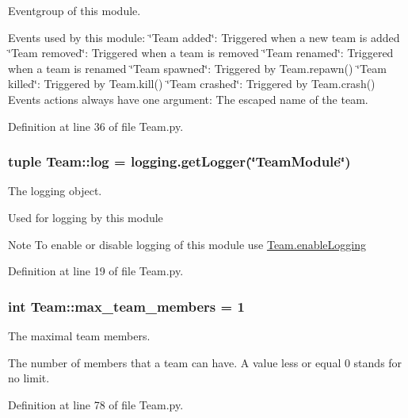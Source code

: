 \-Eventgroup of this module. 

\-Events used by this module\-: \char`\"{}\-Team added\char`\"{}\-: \-Triggered when a new team is added \char`\"{}\-Team removed\char`\"{}\-: \-Triggered when a team is removed \char`\"{}\-Team renamed\char`\"{}\-: \-Triggered when a team is renamed \char`\"{}\-Team spawned\char`\"{}\-: \-Triggered by \-Team.\-repawn() \char`\"{}\-Team killed\char`\"{}\-: \-Triggered by \-Team.\-kill() \char`\"{}\-Team crashed\char`\"{}\-: \-Triggered by \-Team.\-crash() \-Events actions always have one argument\-: \-The escaped name of the team. 

\-Definition at line 36 of file \-Team.\-py.

\hypertarget{namespace_team_adf21711f1fc38203ea2e00d2118b33bc}{
\subsubsection[{log}]{\setlength{\rightskip}{0pt plus 5cm}tuple {\bf \-Team\-::log} = logging.\-get\-Logger(\char`\"{}\-Team\-Module\char`\"{})}}
\label{namespace_team_adf21711f1fc38203ea2e00d2118b33bc}


\-The logging object. 

\-Used for logging by this module \begin{DoxyNote}{\-Note}
\-To enable or disable logging of this module use \hyperlink{namespace_team_abaa01768200015ab5ae4afc3d2d54eec}{\-Team.\-enable\-Logging} 
\end{DoxyNote}


\-Definition at line 19 of file \-Team.\-py.

\hypertarget{namespace_team_a94ac5cfcfc198fffc68d90217c447051}{
\subsubsection[{max\-\_\-team\-\_\-members}]{\setlength{\rightskip}{0pt plus 5cm}int {\bf \-Team\-::max\-\_\-team\-\_\-members} = 1}}
\label{namespace_team_a94ac5cfcfc198fffc68d90217c447051}


\-The maximal team members. 

\-The number of members that a team can have. \-A value less or equal 0 stands for no limit. 

\-Definition at line 78 of file \-Team.\-py.

